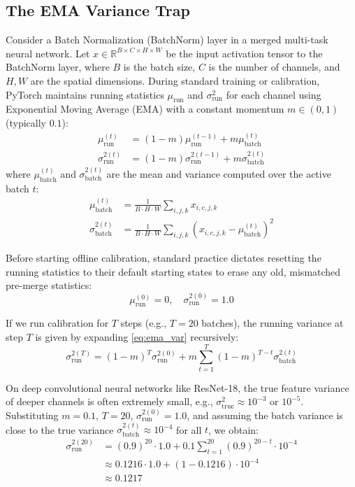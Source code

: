 \documentclass{article}
\theoremstyle{plain}
\theoremstyle{definition}
\theoremstyle{remark}
\begin{document}
\subsection{The EMA Variance Trap}
Consider a Batch Normalization (BatchNorm) layer in a merged multi-task neural network. Let $x \in \mathbb{R}^{B \times C \times H \times W}$ be the input activation tensor to the BatchNorm layer, where $B$ is the batch size, $C$ is the number of channels, and $H, W$ are the spatial dimensions. During standard training or calibration, PyTorch maintains running statistics $\mu_{\text{run}}$ and $\sigma^2_{\text{run}}$ for each channel using Exponential Moving Average (EMA) with a constant momentum $m \in (0, 1)$ (typically $0.1$):
\begin{align}
    \mu_{\text{run}}^{(t)} &= (1 - m) \mu_{\text{run}}^{(t-1)} + m \mu_{\text{batch}}^{(t)} \label{eq:ema_mean} \\
    \sigma^{2 (t)}_{\text{run}} &= (1 - m) \sigma^{2 (t-1)}_{\text{run}} + m \sigma^{2 (t)}_{\text{batch}} \label{eq:ema_var}
\end{align}
where $\mu_{\text{batch}}^{(t)}$ and $\sigma^{2 (t)}_{\text{batch}}$ are the mean and variance computed over the active batch $t$:
\begin{align}
    \mu_{\text{batch}}^{(t)} &= \frac{1}{B \cdot H \cdot W} \sum_{i,j,k} x_{i,c,j,k} \\
    \sigma^{2 (t)}_{\text{batch}} &= \frac{1}{B \cdot H \cdot W} \sum_{i,j,k} (x_{i,c,j,k} - \mu_{\text{batch}}^{(t)})^2
\end{align}

Before starting offline calibration, standard practice dictates resetting the running statistics to their default starting states to erase any old, mismatched pre-merge statistics:
\begin{equation}
    \mu_{\text{run}}^{(0)} = 0, \quad \sigma^{2 (0)}_{\text{run}} = 1.0
\end{equation}

If we run calibration for $T$ steps (e.g., $T=20$ batches), the running variance at step $T$ is given by expanding \cref{eq:ema_var} recursively:
\begin{equation}
    \sigma^{2 (T)}_{\text{run}} = (1 - m)^T \sigma^{2 (0)}_{\text{run}} + m \sum_{t=1}^T (1 - m)^{T-t} \sigma^{2 (t)}_{\text{batch}}
\end{equation}

On deep convolutional neural networks like ResNet-18, the true feature variance of deeper channels is often extremely small, e.g., $\sigma^{2}_{\text{true}} \approx 10^{-3}$ or $10^{-5}$.
Substituting $m = 0.1$, $T = 20$, $\sigma^{2 (0)}_{\text{run}} = 1.0$, and assuming the batch variance is close to the true variance $\sigma^{2 (t)}_{\text{batch}} \approx 10^{-4}$ for all $t$, we obtain:
\begin{align}
    \sigma^{2 (20)}_{\text{run}} &= (0.9)^{20} \cdot 1.0 + 0.1 \sum_{t=1}^{20} (0.9)^{20-t} \cdot 10^{-4} \nonumber \\
    &\approx 0.1216 \cdot 1.0 + (1 - 0.1216) \cdot 10^{-4} \nonumber \\
    &\approx 0.1217
\end{align}
\end{document}
